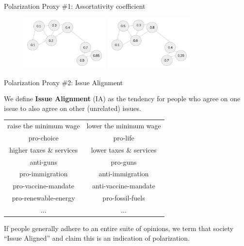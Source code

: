 \documentclass[12pt]{beamer}
\begin{document}
\begin{frame}[c]{Polarization Proxy \#1: Assortativity coefficient} %





\begin{figure}
	\includegraphics[width=0.40\textwidth]{images/HighAssortDiagram.png}
	\hfill
	\includegraphics[width=0.40\textwidth]{images/LowAssortDiagram.png}
\end{figure}

\end{frame}


\begin{frame}[c]{Polarization Proxy \#2: Issue Alignment} %

We define \textbf{Issue Alignment} (IA) as the tendency for people who agree on
one issue to also agree on other (unrelated) issues.

\begin{center}
\begin{tabular}{c|c}
\pause
raise the minimum wage & lower the minimum wage \\
\pause
pro-choice & pro-life \\
\pause
higher taxes \& services & lower taxes \& services \\
\pause
anti-guns & pro-guns \\
\pause
pro-immigration & anti-immigration \\
\pause
pro-vaccine-mandate & anti-vaccine-mandate \\
\pause
pro-renewable-energy & pro-fossil-fuels \\
\pause
... & ... \\
\end{tabular}
\end{center}

\pause
\footnotesize

If people generally adhere to an entire suite of opinions, we term that society
``Issue Aligned'' and claim this is an indication of polarization.

\end{frame}
\end{document}
